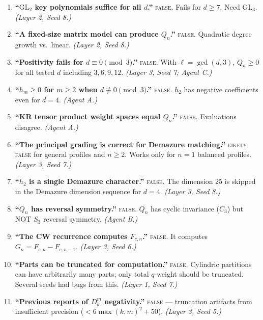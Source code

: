 \documentclass[11pt]{article}
\theoremstyle{definition}
\begin{document}
\begin{enumerate}[label=\textbf{BA\arabic*.}, leftmargin=2.5em]
\item \textbf{``$\mathrm{GL}_2$ key polynomials suffice for all $d$.''} \textsc{false}. Fails for $d \geq 7$. Need $\mathrm{GL}_3$. \emph{(Layer 2, Seed 8.)}

\item \textbf{``A fixed-size matrix model can produce $Q_n$.''} \textsc{false}. Quadratic degree growth vs.\ linear. \emph{(Layer 2, Seed 8.)}

\item \textbf{``Positivity fails for $d \equiv 0\!\pmod{3}$.''} \textsc{false}. With $\ell = \gcd(d,3)$, $Q_n \geq 0$ for all tested $d$ including $3, 6, 9, 12$. \emph{(Layer 3, Seed 7; Agent C.)}

\item \textbf{``$h_m \geq 0$ for $m \geq 2$ when $d \not\equiv 0\!\pmod{3}$.''} \textsc{false}. $h_2$ has negative coefficients even for $d = 4$. \emph{(Agent A.)}

\item \textbf{``KR tensor product weight spaces equal $Q_n$.''} \textsc{false}. Evaluations disagree. \emph{(Agent A.)}

\item \textbf{``The principal grading is correct for Demazure matching.''} \textsc{likely false} for general profiles and $n \geq 2$. Works only for $n = 1$ balanced profiles. \emph{(Layer 3, Seed 7.)}

\item \textbf{``$h_2$ is a single Demazure character.''} \textsc{false}. The dimension 25 is skipped in the Demazure dimension sequence for $d = 4$. \emph{(Layer 3, Seed 8.)}

\item \textbf{``$Q_n$ has reversal symmetry.''} \textsc{false}. $Q_n$ has cyclic invariance ($C_3$) but NOT $S_3$ reversal symmetry. \emph{(Agent B.)}

\item \textbf{``The CW recurrence computes $F_{c,n}$.''} \textsc{false}. It computes $G_n = F_{c,n} - F_{c,n-1}$. \emph{(Layer 3, Seed 6.)}

\item \textbf{``Parts can be truncated for computation.''} \textsc{false}. Cylindric partitions can have arbitrarily many parts; only total $q$-weight should be truncated. Several seeds had bugs from this. \emph{(Layer 1, Seed 7.)}

\item \textbf{``Previous reports of $D_k^m$ negativity.''} \textsc{false} --- truncation artifacts from insufficient precision ($< 6\max(k,m)^2 + 50$). \emph{(Layer 3, Seed 5.)}
\end{enumerate}
\end{document}
